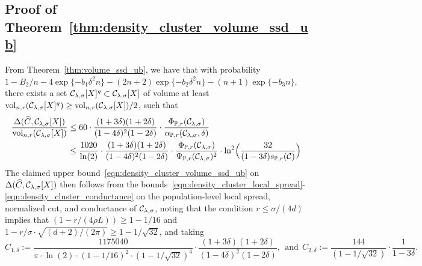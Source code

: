 \subsection{Proof of Theorem~\ref{thm:density_cluster_volume_ssd_ub}}
From Theorem~\ref{thm:volume_ssd_ub}, we have that with probability $1 - B_2/n - 4\exp\{-b_1\delta^2n\} - (2n + 2)\exp\{-b_2\delta^2n\} - (n + 1)\exp\{-b_3n\}$, there exists a set $\mathcal{C}_{\lambda,\sigma}[X]^g \subset \mathcal{C}_{\lambda,\sigma}[X]$ of volume at least $\mathrm{vol}_{n,r}(\mathcal{C}_{\lambda,\sigma}[X]^g) \geq \mathrm{vol}_{n,r}(\mathcal{C}_{\lambda,\sigma}[X])/2$, such that
\begin{align*}
\frac{\Delta(\widehat{C},\mathcal{C}_{\lambda,\sigma}[X])}{\mathrm{vol}_{n,r}(\mathcal{C}_{\lambda,\sigma}[X])} & \leq 60 \cdot \frac{(1 + 3\delta)(1 + 2\delta)}{(1 - 4\delta)^2(1 - 2\delta)} \cdot \frac{\Phi_{\mathbb{P},r}(\mathcal{C}_{\lambda,\sigma})}{\alpha_{\mathbb{P},r}(\mathcal{C}_{\lambda,\sigma},\delta)} \\
& \leq \frac{1020}{\ln(2)} \cdot \frac{(1 + 3\delta)(1 + 2\delta)}{(1 - 4\delta)^2(1 - 2\delta)} \cdot \frac{\Phi_{\mathbb{P},r}(\mathcal{C}_{\lambda,\sigma})}{\Psi_{\mathbb{P},r}(\mathcal{C}_{\lambda,\sigma})^2} \cdot \ln^2\Bigl(\frac{32}{(1 - 3\delta) s_{\mathbb{P},r}(\mathcal{C})}\Bigr)
\end{align*}
The claimed upper bound~\eqref{eqn:density_cluster_volume_ssd_ub} on $\Delta(\widehat{C},\mathcal{C}_{\lambda,\sigma}[X])$ then follows from the bounds~\eqref{eqn:density_cluster_local_spread}-\eqref{eqn:density_cluster_conductance} on the population-level local spread, normalized cut, and conductance of $\mathcal{C}_{\lambda,\sigma}$, noting that the condition $r \leq \sigma/(4d)$ implies that $(1 - r/(4\rho L)) \geq 1 - 1/16$ and $1 - r/\sigma \cdot \sqrt{(d + 2)/(2\pi)} \geq 1 - 1/\sqrt{32}$, and taking
\begin{equation*}
C_{1,\delta} := \frac{1175040}{\pi \cdot \ln(2) \cdot (1 - 1/16)^2 \cdot (1 - 1/\sqrt{32})^4} \cdot \frac{(1 + 3\delta)(1 + 2\delta)}{(1 - 4\delta)^2(1 - 2\delta)},~~\textrm{and}~~C_{2,\delta} := \frac{144}{(1 - 1/\sqrt{32})} \cdot \frac{1}{1-3\delta}.
\end{equation*}

